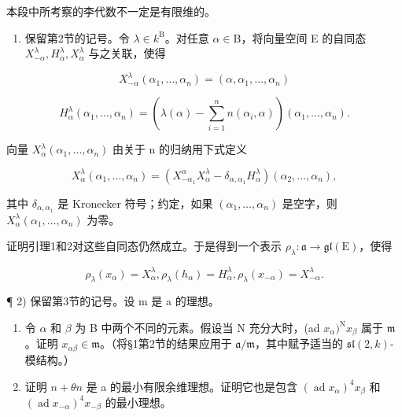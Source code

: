 
本段中所考察的李代数不一定是有限维的。

\begin{enumerate}
\def\labelenumi{\arabic{enumi})}
\tightlist
\item
  保留第2节的记号。令 \(\lambda \in k^{\mathrm{B}}\)。对任意 \(\alpha \in \mathrm{B}\)，将向量空间 E 的自同态 \(X_{-\alpha}^{\lambda}, H_{\alpha}^{\lambda}, X_{\alpha}^{\lambda}\) 与之关联，使得
\end{enumerate}

\[
X _ {- \alpha} ^ {\lambda} (\alpha_ {1}, \ldots , \alpha_ {n}) = (\alpha , \alpha_ {1}, \ldots , \alpha_ {n})
\]

\[
H _ {\alpha} ^ {\lambda} (\alpha_ {1}, \ldots , \alpha_ {n}) = (\lambda (\alpha) - \sum_ {i = 1} ^ {n} n (\alpha_ {i}, \alpha)) (\alpha_ {1}, \ldots , \alpha_ {n}).
\]

向量 \(X_{\alpha}^{\lambda}(\alpha_{1},\ldots,\alpha_{n})\) 由关于 n 的归纳用下式定义

\[
X _ {\alpha} ^ {\lambda} (\alpha_ {1}, \ldots , \alpha_ {n}) = (X _ {- \alpha_ {1}} ^ {\alpha} X _ {\alpha} ^ {\lambda} - \delta_ {\alpha , \alpha_ {1}} H _ {\alpha} ^ {\lambda}) (\alpha_ {2}, \ldots , \alpha_ {n}),
\]

其中 \(\delta_{\alpha, \alpha_1}\) 是 Kronecker 符号；约定，如果 \((\alpha_1, \ldots, \alpha_n)\) 是空字，则 \(X_{\alpha}^{\lambda}(\alpha_1, \ldots, \alpha_n)\) 为零。

证明引理1和2对这些自同态仍然成立。于是得到一个表示 \(\rho_{\lambda}:\mathfrak{a}\to \mathfrak{gl}(\mathrm{E})\)，使得

\[
\rho_ {\lambda} (x _ {\alpha}) = X _ {\alpha} ^ {\lambda}, \rho_ {\lambda} (h _ {\alpha}) = H _ {\alpha} ^ {\lambda}, \rho_ {\lambda} (x _ {- \alpha}) = X _ {- \alpha} ^ {\lambda}.
\]

¶ 2) 保留第3节的记号。设 m 是 a 的理想。

\begin{enumerate}
\def\labelenumi{\alph{enumi})}
\item
  令 \(\alpha\) 和 \(\beta\) 为 B 中两个不同的元素。假设当 N 充分大时，(ad \(x_{\alpha})^{\mathrm{N}}x_{\beta}\) 属于 \(\mathfrak{m}\)。证明 \(x_{\alpha \beta} \in \mathfrak{m}\)。（将§1第2节的结果应用于 \(\mathfrak{a} / \mathfrak{m}\)，其中赋予适当的 \(\mathfrak{sl}(2,k)\)-模结构。）
\item
  证明 \(n + \theta n\) 是 a 的最小有限余维理想。证明它也是包含 \((\operatorname{ad} x_{\alpha})^{4}x_{\beta}\) 和 \((\operatorname{ad} x_{-\alpha})^{4}x_{-\beta}\) 的最小理想。
\end{enumerate}

